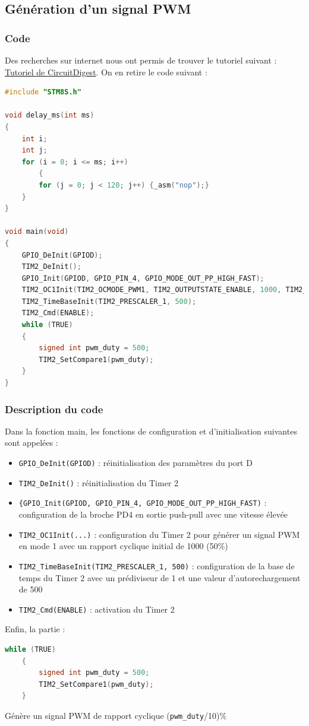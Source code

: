 \documentclass[11pt,a4paper]{article}
\begin{document}
\subsection{Génération d'un signal PWM}
\subsubsection{Code}
Des recherches sur internet nous ont permis de trouver le tutoriel suivant : \href{https://circuitdigest.com/microcontroller-projects/pulse-width-modulation-pwm-with-stm8-using-cosmic-c-and-stvd}{Tutoriel de CircuitDigest}. On en retire le code suivant :

\begin{lstlisting}[language=C]
#include "STM8S.h"

void delay_ms(int ms)
{
	int i;
	int j;
    for (i = 0; i <= ms; i++)
    	{
        for (j = 0; j < 120; j++) {_asm("nop");}
    }
}

void main(void)
{
    GPIO_DeInit(GPIOD);
    TIM2_DeInit();
    GPIO_Init(GPIOD, GPIO_PIN_4, GPIO_MODE_OUT_PP_HIGH_FAST);
    TIM2_OC1Init(TIM2_OCMODE_PWM1, TIM2_OUTPUTSTATE_ENABLE, 1000, TIM2_OCPOLARITY_HIGH);
    TIM2_TimeBaseInit(TIM2_PRESCALER_1, 500);
    TIM2_Cmd(ENABLE);
    while (TRUE)
    {
        signed int pwm_duty = 500;
        TIM2_SetCompare1(pwm_duty);
    }
}
\end{lstlisting}

\subsubsection{Description du code}
Dans la fonction main, les fonctions de configuration et d'initialisation suivantes sont appelées :
\begin{itemize}
\item \lstinline$GPIO_DeInit(GPIOD)$ : réinitialisation des paramètres du port D
\item \lstinline$TIM2_DeInit()$ : réinitialisation du Timer 2
\item \lstinline${GPIO_Init(GPIOD, GPIO_PIN_4, GPIO_MODE_OUT_PP_HIGH_FAST)$ : configuration de la broche PD4 en sortie push-pull avec une vitesse élevée
\item \lstinline$TIM2_OC1Init(...)$ : configuration du Timer 2 pour générer un signal PWM en mode 1 avec un rapport cyclique initial de 1000 (50\%)
\item \lstinline$TIM2_TimeBaseInit(TIM2_PRESCALER_1, 500)$ : configuration de la base de temps du Timer 2 avec un prédiviseur de 1 et une valeur d'autorechargement de 500
\item \lstinline$TIM2_Cmd(ENABLE)$ : activation du Timer 2
\end{itemize}
\pagebreak
Enfin, la partie :
\begin{lstlisting}[language=C]
while (TRUE)
    {
        signed int pwm_duty = 500;
        TIM2_SetCompare1(pwm_duty);
    }
\end{lstlisting}
Génère un signal PWM de rapport cyclique (\lstinline$pwm_duty$/10)\%
\end{document}
